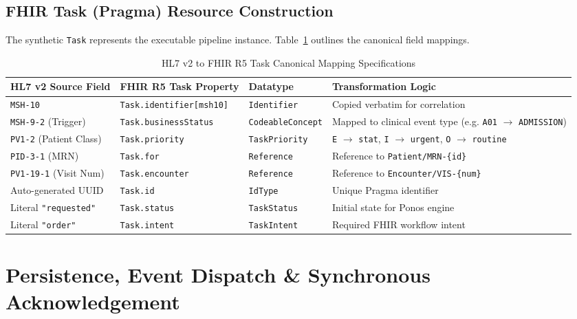\subsection{FHIR Task (Pragma) Resource Construction}

The synthetic \texttt{Task} represents the executable pipeline instance. Table~\ref{tab:hl7_task_mapping} outlines the canonical field mappings.

\begin{table}[htbp]
\centering
\small
\begin{tabularx}{\textwidth}{l p{3.5cm} l p{4.5cm}}
\toprule
\textbf{HL7 v2 Source Field} & \textbf{FHIR R5 Task Property} & \textbf{Datatype} & \textbf{Transformation Logic} \\
\midrule
\texttt{MSH-10} & \texttt{Task.identifier[msh10]} & \texttt{Identifier} & Copied verbatim for correlation \\
\texttt{MSH-9-2} (Trigger) & \texttt{Task.businessStatus} & \texttt{CodeableConcept} & Mapped to clinical event type (e.g. \texttt{A01} $\to$ \texttt{ADMISSION}) \\
\texttt{PV1-2} (Patient Class) & \texttt{Task.priority} & \texttt{TaskPriority} & \texttt{E} $\to$ \texttt{stat}, \texttt{I} $\to$ \texttt{urgent}, \texttt{O} $\to$ \texttt{routine} \\
\texttt{PID-3-1} (MRN) & \texttt{Task.for} & \texttt{Reference} & Reference to \texttt{Patient/MRN-\{id\}} \\
\texttt{PV1-19-1} (Visit Num) & \texttt{Task.encounter} & \texttt{Reference} & Reference to \texttt{Encounter/VIS-\{num\}} \\
Auto-generated UUID & \texttt{Task.id} & \texttt{IdType} & Unique Pragma identifier \\
Literal \texttt{"requested"} & \texttt{Task.status} & \texttt{TaskStatus} & Initial state for Ponos engine \\
Literal \texttt{"order"} & \texttt{Task.intent} & \texttt{TaskIntent} & Required FHIR workflow intent \\
\bottomrule
\end{tabularx}
\caption{HL7 v2 to FHIR R5 Task Canonical Mapping Specifications}
\label{tab:hl7_task_mapping}
\end{table}

\section{Persistence, Event Dispatch \& Synchronous Acknowledgement}
\label{sec:ingress_persistence_ack}

